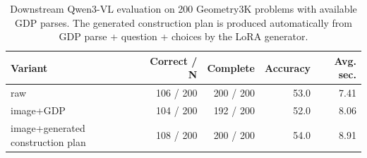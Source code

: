 \begin{table}[t]
\centering
\caption{Downstream Qwen3-VL evaluation on 200 Geometry3K problems with available GDP parses. The generated construction plan is produced automatically from GDP parse + question + choices by the LoRA generator.}
\label{tab:downstream200}
\small
\begin{tabular}{lrrrr}
\toprule
Variant & Correct / N & Complete & Accuracy & Avg. sec. \\
\midrule
raw & 106 / 200 & 200 / 200 & 53.0 & 7.41 \\
image+GDP & 104 / 200 & 192 / 200 & 52.0 & 8.06 \\
image+generated construction plan & 108 / 200 & 200 / 200 & 54.0 & 8.91 \\
\bottomrule
\end{tabular}
\end{table}

